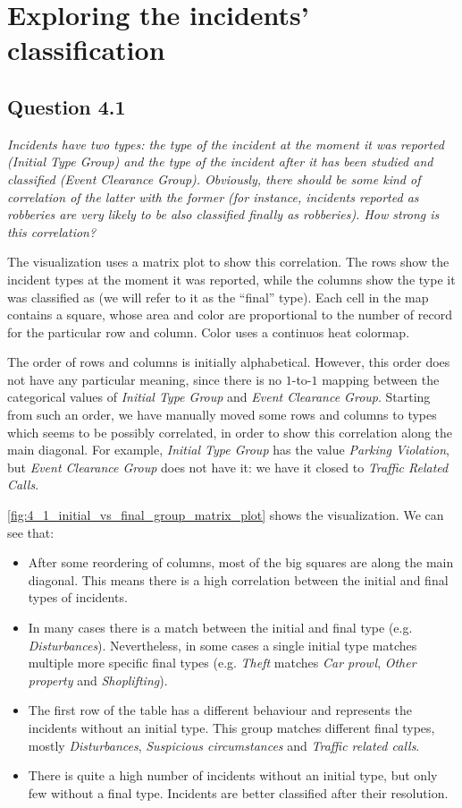 \section{Exploring the incidents' classification}

\subsection*{Question 4.1}
\textit{Incidents have two types: the type of the incident at the moment it was reported (Initial Type Group) and the type of the incident after it has been studied and classified (Event Clearance Group). Obviously, there should be some kind of correlation of the latter with the former (for instance, incidents reported as robberies are very likely to be also classified finally as robberies). How strong is this correlation?}

The visualization uses a matrix plot to show this correlation.
The rows show the incident types at the moment it was reported, while the columns show the type it was classified as (we will refer to it as the ``final'' type).
Each cell in the map contains a square, whose area and color are proportional to the number of record for the particular row and column.
Color uses a continuos heat colormap.

The order of rows and columns is initially alphabetical.
However, this order does not have any particular meaning, since there is no $1$-to-$1$ mapping between the categorical values of \textit{Initial Type Group} and \textit{Event Clearance Group}.
Starting from such an order, we have manually moved some rows and columns to types which seems to be possibly correlated, in order to show this correlation along the main diagonal.
For example, \textit{Initial Type Group} has the value \textit{Parking Violation}, but \textit{Event Clearance Group} does not have it:
we have it closed to \textit{Traffic Related Calls}.

\cref{fig:4_1_initial_vs_final_group_matrix_plot} shows the visualization.
We can see that:
\begin{itemize}
    \item After some reordering of columns, most of the big squares are along the main diagonal. This means there is a high correlation between the initial and final types of incidents.
    \item In many cases there is a match between the initial and final type (e.g. \textit{Disturbances}). Nevertheless, in some cases a single initial type matches multiple more specific final types (e.g. \textit{Theft} matches \textit{Car prowl}, \textit{Other property} and \textit{Shoplifting}).
	\item The first row of the table has a different behaviour and represents the incidents without an initial type. This group matches different final types, mostly \textit{Disturbances}, \textit{Suspicious circumstances} and \textit{Traffic related calls}.
	\item There is quite a high number of incidents without an initial type, but only few without a final type. Incidents are better classified after their resolution.
\end{itemize}

